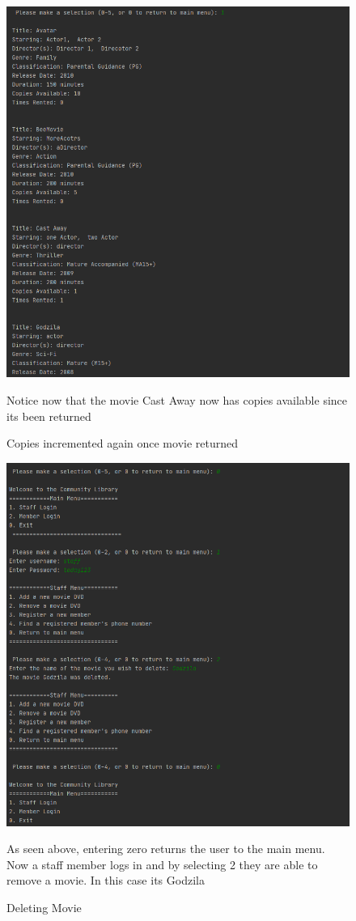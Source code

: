 \documentclass[a4paper,12pt]{article}
\begin{document}
\begin{figure}[!htb]
\centering
\includegraphics[width=1\textwidth]{11}
\caption{Copies incremented again once movie returned}
\medskip
\small
Notice now that the movie Cast Away now has copies available since its been returned
\end{figure}


\begin{figure}[!htb]
\centering
\includegraphics[width=1\textwidth]{12}
\caption{Deleting Movie}
\medskip
\small
As seen above, entering zero returns the user to the main menu. Now a staff member logs in and by selecting 2 they are able to remove a movie. In this case its Godzila
\end{figure}
\end{document}
